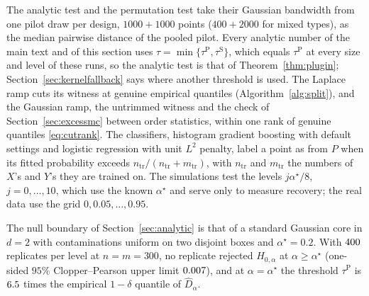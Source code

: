 The analytic test and the permutation test take their Gaussian bandwidth from one pilot draw per design, $1000+1000$
points ($400+2000$ for mixed types), as the median pairwise distance of the pooled pilot. Every analytic number of the
main text and of this section uses $\tau=\min\{\tau^{\mathrm P},\tau^{\mathrm S}\}$, which equals $\tau^{\mathrm P}$ at
every size and level of these runs, so the analytic test is that of Theorem~\ref{thm:plugin};
Section~\ref{sec:kernelfallback} says where another threshold is used. The Laplace ramp cuts its witness
at genuine empirical quantiles (Algorithm~\ref{alg:split}), and the Gaussian ramp, the untrimmed witness and the check
of Section~\ref{sec:excessmc} between order statistics, within one rank of genuine quantiles \eqref{eq:cutrank}. The
classifiers, histogram gradient boosting with default settings and logistic regression with unit $L^2$ penalty, label a
point as from $P$ when its fitted probability exceeds $n_{\mathrm{tr}}/(n_{\mathrm{tr}}+m_{\mathrm{tr}})$, with
$n_{\mathrm{tr}}$ and $m_{\mathrm{tr}}$ the numbers of $X$'s and $Y$'s they are trained on. The simulations test the levels $j\alpha^\star/8$, $j=0,\dots,10$, which use the known
$\alpha^\star$ and serve only to measure recovery; the real data use the grid $0,0.05,\dots,0.95$.

The null boundary of Section~\ref{sec:analytic} is that of a standard Gaussian core in $d=2$ with contaminations
uniform on two disjoint boxes and $\alpha^\star=0.2$. With $400$ replicates per level at $n=m=300$, no replicate
rejected $H_{0,\alpha}$ at $\alpha\ge\alpha^\star$ (one-sided $95\%$ Clopper--Pearson upper limit $0.007$), and at
$\alpha=\alpha^\star$ the threshold $\tau^{\mathrm P}$ is $6.5$ times the empirical $1-\delta$ quantile of
$\widehat D_\alpha$.

